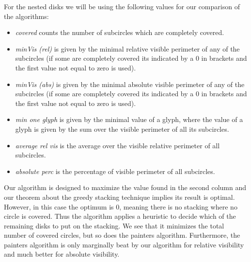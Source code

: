 \documentclass[a4paper,11pt]{article}
\begin{document}
For the nested disks we will be using the following values for our comparison of the algorithms:
\begin{itemize}
  \item \textit{covered} counts the number of subcircles which are completely covered.
  \item \textit{minVis (rel)} is given by the minimal relative visible perimeter of any of the subcircles (if some are completely covered its indicated by a 0 in brackets and the first value not equal to zero is used).
  \item \textit{minVis (abs)} is given by the minimal absolute visible perimeter of any of the subcircles (if some are completely covered its indicated by a 0 in brackets and the first value not equal to zero is used).
  \item \textit{min one glyph} is given by the minimal value of a glyph, where the value of a glyph is given by the sum over the visible perimeter of all its subcircles.
  \item \textit{average rel vis} is the average over the visible relative perimeter of all subcircles.
  \item \textit{absolute perc} is the percentage of visible perimeter of all subcircles.
\end{itemize}

Our algorithm is designed to maximize the value found in the second column and our theorem about the greedy stacking technique implies its result is optimal. However, in this case the optimum is 0, meaning there is no stacking where no circle is covered. Thus the algorithm applies a heuristic to decide which of the remaining disks to put on the stacking. We see that it minimizes the total number of covered circles, but so does the painters algorithm. Furthermore, the painters algorithm is only marginally beat by our algorithm for relative visibility and much better for absolute visibility.
\end{document}
